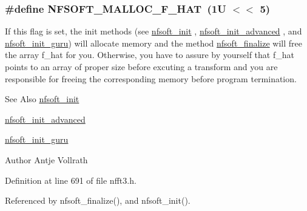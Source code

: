 \hypertarget{group__nfsoft_ga846e8298ed59219f7072230bd61c7a2a}{
\subsubsection[{N\-F\-S\-O\-F\-T\-\_\-\-M\-A\-L\-L\-O\-C\-\_\-\-F\-\_\-\-H\-A\-T}]{\setlength{\rightskip}{0pt plus 5cm}\#define N\-F\-S\-O\-F\-T\-\_\-\-M\-A\-L\-L\-O\-C\-\_\-\-F\-\_\-\-H\-A\-T~(1\-U $<$$<$ 5)}}\label{group__nfsoft_ga846e8298ed59219f7072230bd61c7a2a}
If this flag is set, the init methods (see \hyperlink{group__nfsoft_ga31c884458165fa204073c6c16c10775e}{nfsoft\-\_\-init} , \hyperlink{group__nfsoft_gaf4aec4ee2a2a5d56ca27c4f1a7f90b18}{nfsoft\-\_\-init\-\_\-advanced} , and \hyperlink{group__nfsoft_ga1c13cdd3f82f48fa41acdd313cdc2052}{nfsoft\-\_\-init\-\_\-guru}) will allocate memory and the method \hyperlink{group__nfsoft_ga30b5c6ae1ff496680f11ddcaad2d5a47}{nfsoft\-\_\-finalize} will free the array {\ttfamily f\-\_\-hat} for you. Otherwise, you have to assure by yourself that {\ttfamily f\-\_\-hat} points to an array of proper size before excuting a transform and you are responsible for freeing the corresponding memory before program termination.

\begin{DoxySeeAlso}{See Also}
\hyperlink{group__nfsoft_ga31c884458165fa204073c6c16c10775e}{nfsoft\-\_\-init} 

\hyperlink{group__nfsoft_gaf4aec4ee2a2a5d56ca27c4f1a7f90b18}{nfsoft\-\_\-init\-\_\-advanced} 

\hyperlink{group__nfsoft_ga1c13cdd3f82f48fa41acdd313cdc2052}{nfsoft\-\_\-init\-\_\-guru} 
\end{DoxySeeAlso}
\begin{DoxyAuthor}{Author}
Antje Vollrath 
\end{DoxyAuthor}


Definition at line 691 of file nfft3.\-h.



Referenced by nfsoft\-\_\-finalize(), and nfsoft\-\_\-init().

